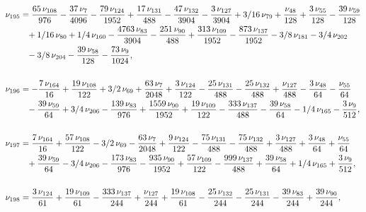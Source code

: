 \documentclass[a4paper,12pt, DIV=14, BCOR=5mm, twoside, headsepline]{scrbook}
\begin{document}
\begin{align}\label{AreaSol18}
\begin{aligned}
\nu_{{195}}&={\frac {65\,\nu_{{108}}}{976}}-{\frac {37\,\nu_{{7}
}}{4096}}-{\frac {79\,\nu_{{124}}}{1952}}+{\frac {17\,\nu_{{131}}}{488
}}-{\frac {47\,\nu_{{132}}}{3904}}-{\frac {3\,\nu_{{127}}}{3904}}+3/16
\,\nu_{{79}}+{\frac {\nu_{{48}}}{128}}+{\frac {3\,\nu_{{55}}}{128}}-{
\frac {39\,\nu_{{59}}}{128}}\\
 &\hphantom{=}+1/16\,\nu_{{80}}+1/4\,\nu_{{160}}-{\frac 
{4763\,\nu_{{83}}}{3904}}-{\frac {251\,\nu_{{90}}}{488}}+{\frac {313\,
\nu_{{109}}}{1952}}-{\frac {873\,\nu_{{137}}}{1952}}-3/8\,\nu_{{181}}-
3/4\,\nu_{{202}}\\
 &\hphantom{=}-3/8\,\nu_{{204}}-{\frac {39\,\nu_{{58}}}{128}}-{
\frac {73\,\nu_{{9}}}{1024}},\\
\\
\nu_{{196}}&=-{\frac {7\,\nu_{{164}}}{16}}
+{\frac {19\,\nu_{{108}}}{122}}+3/2\,\nu_{{69}}+{\frac {63\,\nu_{{7}}
}{2048}}+{\frac {3\,\nu_{{124}}}{122}}-{\frac {25\,\nu_{{131}}}{488}}-
{\frac {25\,\nu_{{132}}}{488}}+{\frac {\nu_{{127}}}{488}}-{\frac {3\,
\nu_{{48}}}{64}}-{\frac {\nu_{{55}}}{64}}\\
 &\hphantom{=}-{\frac {39\,\nu_{{59}}}{64}}
+3/4\,\nu_{{206}}-{\frac {139\,\nu_{{83}}}{976}}+{\frac {1559\,\nu_{{
90}}}{1952}}+{\frac {19\,\nu_{{109}}}{122}}-{\frac {333\,\nu_{{137}}}{
488}}-{\frac {39\,\nu_{{58}}}{64}}-1/4\,\nu_{{165}}-{\frac {3\,\nu_{{9
}}}{512}}, \\
\\
\nu_{{197}}&={\frac {7\,\nu_{{164}}}{16}}+{\frac {57\,\nu_{{
108}}}{122}}-3/2\,\nu_{{69}}-{\frac {63\,\nu_{{7}}}{2048}}+{\frac {9\,
\nu_{{124}}}{122}}-{\frac {75\,\nu_{{131}}}{488}}-{\frac {75\,\nu_{{
132}}}{488}}+{\frac {3\,\nu_{{127}}}{488}}+{\frac {3\,\nu_{{48}}}{64}}
+{\frac {\nu_{{55}}}{64}}\\
 &\hphantom{=}+{\frac {39\,\nu_{{59}}}{64}}-3/4\,\nu_{{206}
}-{\frac {173\,\nu_{{83}}}{976}}-{\frac {935\,\nu_{{90}}}{1952}}+{
\frac {57\,\nu_{{109}}}{122}}-{\frac {999\,\nu_{{137}}}{488}}+{\frac {
39\,\nu_{{58}}}{64}}+1/4\,\nu_{{165}}+{\frac {3\,\nu_{{9}}}{512}}, \\
\\
\nu_
{{198}}&={\frac {3\,\nu_{{124}}}{61}}+{\frac {19\,\nu_{{109}}}{61}}-{
\frac {333\,\nu_{{137}}}{244}}+{\frac {\nu_{{127}}}{244}}+{\frac {19\,
\nu_{{108}}}{61}}-{\frac {25\,\nu_{{132}}}{244}}-{\frac {25\,\nu_{{131
}}}{244}}-{\frac {39\,\nu_{{83}}}{244}}+{\frac {39\,\nu_{{90}}}{244}},\\

\end{aligned}
\end{align}
\end{document}
